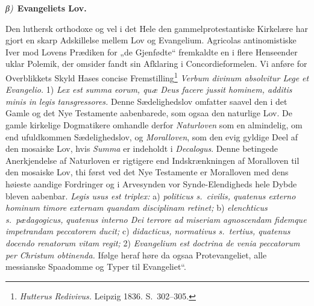\documentclass[12pt]{book}
\newcommand{\greekrun}[2]{%
  \medskip\begin{center}{\itshape #1)}\ {\bfseries #2}\end{center}\medskip}
\begin{document}
\greekrun{β}{Evangeliets Lov.}

Den luthersk orthodoxe og vel i det Hele den gammelprotestantiske
Kirkelære har gjort en skarp Adskillelse mellem Lov og Evangelium.
Agricolas antinomistiske Iver mod Lovens Prædiken for „de
Gjenfødte“ fremkaldte en i flere Henseender uklar Polemik, der
omsider fandt sin Afklaring i Concordieformelen. Vi anføre for
Overblikkets Skyld Hases concise Fremstilling\footnote{\textit{Hutterus
Redivivus.} Leipzig 1836. S.\ 302--305.}
\textit{Verbum divinum absolvitur
Lege et Evangelio.} 1) \textit{Lex est summa eorum, quæ Deus facere
jussit hominem, additis minis in legis tansgressores.}
Denne
Sædelighedslov omfatter saavel den i det Gamle og det Nye Testamente
aabenbarede, som ogsaa den naturlige Lov. De gamle kirkelige
Dogmatikere omhandle derfor \emph{Naturloven} som en almindelig, om
end ufuldkommen Sædelighedslov, og \emph{Moralloven}, som den evig
gyldige Deel af den mosaiske Lov, hvis \textit{Summa} er indeholdt i
\textit{Decalogus}. Denne betingede Anerkjendelse af Naturloven er
rigtigere end Indskrænkningen af Moralloven til den mosaiske Lov,
thi først ved det Nye Testamente er Moralloven med dens høieste
aandige Fordringer og i Arvesynden vor Synde-Elendigheds hele Dybde
bleven aabenbar. \textit{Legis usus est triplex:} a)
\textit{politicus s.\ civilis, quatenus externo hominum timore
externam quandam disciplinam retinet;} b) \textit{elenchticus
s.\ pædagogicus,}
\textit{quatenus interno Dei terrore ad miseriam agnoscendam
fidemque impetrandam peccatorem ducit;} c) \textit{didacticus,
normativus s.\ tertius, quatenus docendo renatorum vitam regit;} 2)
\textit{Evangelium est doctrina de venia peccatorum per Christum
obtinenda.} Ifølge heraf høre da ogsaa Protevangeliet, alle
messianske Spaadomme og Typer til Evangeliet“.
\end{document}
